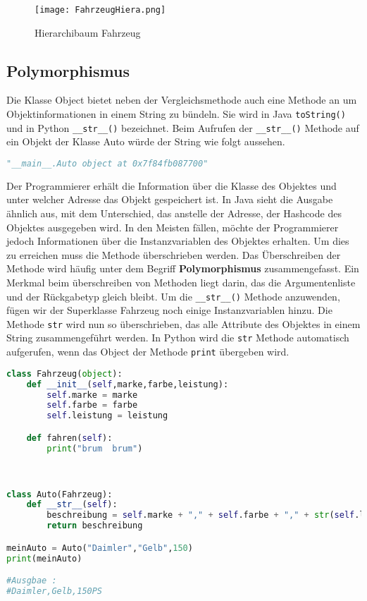 \begin{figure}[!htb]
\centering
\texttt{[image: FahrzeugHiera.png]}%
\caption{Hierarchibaum Fahrzeug}
\label{img:Hierarchiebaum}
\end{figure}

%
%
\subsection{Polymorphismus} \label{subsec:Polymorphismus}
Die Klasse Object bietet neben der Vergleichsmethode auch eine Methode an um Objektinformationen in einem String zu bündeln. 
Sie wird in Java \texttt{toString()} und in Python \texttt{\_\_str\_\_()} bezeichnet. Beim Aufrufen der \texttt{\_\_str\_\_()} Methode auf ein Objekt der Klasse Auto würde der String wie folgt aussehen. 

\begin{lstlisting}[caption= \_\_str\_\_ Ausgabe Python, label=lst:strPython,language=Python]
 "__main__.Auto object at 0x7f84fb087700"   
\end{lstlisting}

Der Programmierer erhält die Information über die Klasse des Objektes und unter welcher Adresse das Objekt gespeichert ist. In Java sieht die Ausgabe ähnlich aus, mit dem Unterschied, das anstelle der Adresse, der Hashcode des Objektes ausgegeben wird. In den Meisten fällen, möchte der Programmierer jedoch Informationen über die Instanzvariablen des Objektes erhalten. Um dies zu erreichen muss die Methode überschrieben werden. Das Überschreiben der Methode wird häufig unter dem Begriff \textbf{Polymorphismus} zusammengefasst. Ein Merkmal beim überschreiben von Methoden liegt darin, das die Argumentenliste und der Rückgabetyp gleich bleibt. Um die \texttt{\_\_str\_\_()} Methode anzuwenden, fügen wir der Superklasse Fahrzeug noch einige Instanzvariablen hinzu. Die Methode \texttt{str} wird nun so überschrieben, das alle Attribute des Objektes in einem String zusammengeführt werden. In Python wird die \texttt{str} Methode automatisch aufgerufen, wenn das Object der Methode \texttt{print} übergeben wird. 

\begin{lstlisting}[caption= \_\_str\_\_ Ueberschrieben, label=lst:UeberschreibenStr,language=Python]
class Fahrzeug(object):
    def __init__(self,marke,farbe,leistung):
        self.marke = marke
        self.farbe = farbe
        self.leistung = leistung

    def fahren(self):
        print("brum  brum")



class Auto(Fahrzeug):
    def __str__(self):
        beschreibung = self.marke + "," + self.farbe + "," + str(self.leistung) + "PS"
        return beschreibung

meinAuto = Auto("Daimler","Gelb",150)
print(meinAuto)

#Ausgbae :
#Daimler,Gelb,150PS
\end{lstlisting}

